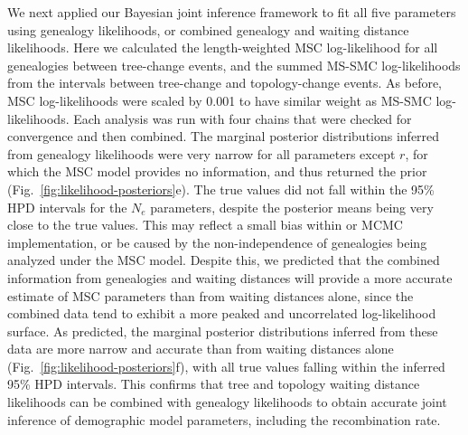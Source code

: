 \documentclass[11pt]{article}
\begin{document}
% 
% 
We next applied our Bayesian joint inference framework to fit all five 
parameters using genealogy likelihoods, or combined genealogy and waiting 
distance likelihoods. Here we calculated the length-weighted MSC 
log-likelihood for all genealogies between tree-change events, and the 
summed MS-SMC log-likelihoods from the intervals between tree-change and 
topology-change events. As before, MSC log-likelihoods were scaled by 0.001
to have similar weight as MS-SMC log-likelihoods. Each analysis was run 
with four chains that were checked for convergence and then combined.
% 
The marginal posterior distributions inferred from genealogy likelihoods 
were very narrow for all parameters except $r$, for which the MSC model
provides no information, and thus returned the prior
(Fig.~\ref{fig:likelihood-posteriors}e). 
The true values did not fall within the 95\% HPD intervals for the $N_e$
parameters, despite the posterior means being very close to the true 
values. 
This may reflect a small bias within or MCMC implementation, or be caused
by the non-independence of genealogies being analyzed under the MSC model.
Despite this, we predicted that the combined information from genealogies
and waiting distances will provide a more accurate estimate of MSC 
parameters than from waiting distances alone, since the combined data 
tend to exhibit a more peaked and uncorrelated log-likelihood surface.
As predicted, the marginal posterior distributions inferred from these data
are more narrow and accurate than from waiting distances alone
(Fig.~\ref{fig:likelihood-posteriors}f), with all true values falling 
within the inferred 95\% HPD intervals.
This confirms that tree and topology waiting distance likelihoods can be 
combined with genealogy likelihoods to obtain accurate joint inference
of demographic model parameters, including the recombination rate. 
\end{document}
